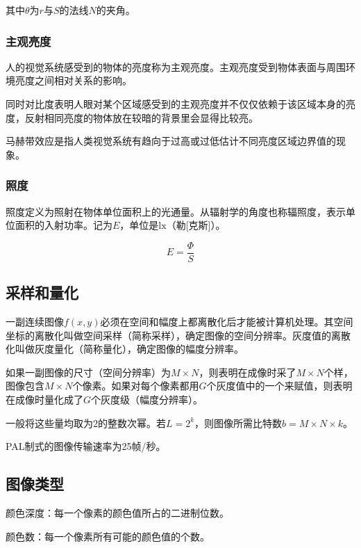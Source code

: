 \documentclass[cn, blue, normal, 12pt]{elegantnote}
\begin{document}
其中$\theta$为$r$与$S$的法线$N$的夹角。

\subsubsection{主观亮度}

人的视觉系统感受到的物体的亮度称为主观亮度。主观亮度受到物体表面与周围环境亮度之间相对关系的影响。

同时对比度表明人眼对某个区域感受到的主观亮度并不仅仅依赖于该区域本身的亮度，反射相同亮度的物体放在较暗的背景里会显得比较亮。

马赫带效应是指人类视觉系统有趋向于过高或过低估计不同亮度区域边界值的现象。

\subsubsection{照度}

照度定义为照射在物体单位面积上的光通量。从辐射学的角度也称辐照度，表示单位面积的入射功率。记为$E$，单位是$\mathrm{lx}$（勒[克斯]）。

\begin{equation}
    E=\frac{\varPhi}{S}
\end{equation}

\subsection{采样和量化}

一副连续图像$f(x,y)$必须在空间和幅度上都离散化后才能被计算机处理。其空间坐标的离散化叫做空间采样（简称采样），确定图像的空间分辨率。灰度值的离散化叫做灰度量化（简称量化），确定图像的幅度分辨率。

如果一副图像的尺寸（空间分辨率）为$M\times N$，则表明在成像时采了$M\times N$个样，图像包含$M\times N$个像素。如果对每个像素都用$G$个灰度值中的一个来赋值，则表明在成像时量化成了$G$个灰度级（幅度分辨率）。

一般将这些量均取为$2$的整数次幂。若$L=2^k$，则图像所需比特数$b=M\times N\times k$。

PAL制式的图像传输速率为25帧/秒。

\subsection{图像类型}

颜色深度：每一个像素的颜色值所占的二进制位数。

颜色数：每一个像素所有可能的颜色值的个数。
\end{document}
